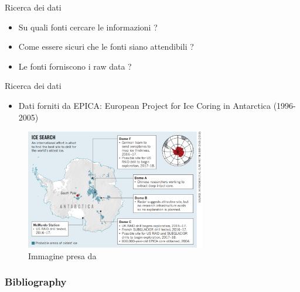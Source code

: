 \documentclass{beamer}
\begin{document}
\begin{frame}{Ricerca dei dati}
\begin{itemize}
\item Su quali fonti cercare le informazioni ? 
\item Come essere sicuri che le fonti siano attendibili ? 
\item Le fonti forniscono i raw data ? 
\end{itemize}
\end{frame}

\begin{frame}{Ricerca dei dati}
\begin{itemize}
\item Dati forniti da EPICA: European Project for Ice Coring in Antarctica (1996-2005)
\end{itemize}
\begin{figure}
\begin{center}
\includegraphics[width=0.7\textwidth ]{Pic/EPICAC.png}
\caption{Immagine presa da \cite{EPICAC}}
\end{center}
\end{figure}

\end{frame}


\begin{frame}[t,allowframebreaks]
\frametitle{Bibliography}
\printbibliography
\end{frame}
\end{document}
